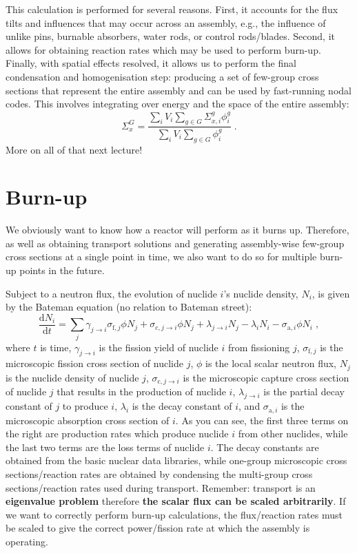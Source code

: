 \documentclass{article}
\begin{document}
This calculation is performed for several reasons. First, it accounts for the flux tilts and influences that may occur across an assembly, e.g., the influence of unlike pins, burnable absorbers, water rods, or control rods/blades. Second, it allows for obtaining reaction rates which may be used to perform burn-up. Finally, with spatial effects resolved, it allows us to perform the final condensation and homogenisation step: producing a set of few-group cross sections that represent the entire assembly and can be used by fast-running nodal codes. This involves integrating over energy and the space of the entire assembly:
\begin{equation}
    \Sigma^G_x = \frac{\sum_i V_i \sum_{g\in G}\Sigma^g_{x,i}\phi^g_i}{\sum_i V_i \sum_{g\in G}\phi^g_i}\;\mathrm{.}
\end{equation}
More on all of that next lecture!

\section{Burn-up}

We obviously want to know how a reactor will perform as it burns up. Therefore, as well as obtaining transport solutions and generating assembly-wise few-group cross sections at a single point in time, we also want to do so for multiple burn-up points in the future.

Subject to a neutron flux, the evolution of nuclide $i$'s nuclide density, $N_i$, is given by the Bateman equation (no relation to Bateman street):
\begin{equation}\label{eq:bateman}
    \frac{\mathrm{d}N_i}{\mathrm{d}t} = \sum_j \gamma_{j\rightarrow i}\sigma_{\mathrm{f},j}\phi N_j + \sigma_{\mathrm{c},j\rightarrow i}\phi N_j +\lambda_{j\rightarrow i}N_j - \lambda_i N_i - \sigma_{\mathrm{a},i}\phi N_i\;\mathrm{,}
\end{equation}
where $t$ is time, $\gamma_{j\rightarrow i}$ is the fission yield of nuclide $i$ from fissioning $j$, $\sigma_{\mathrm{f},j}$ is the microscopic fission cross section of nuclide $j$, $\phi$ is the local scalar neutron flux, $N_j$ is the nuclide density of nuclide $j$, $\sigma_{\mathrm{c},j\rightarrow i}$ is the microscopic capture cross section of nuclide $j$ that results in the production of nuclide $i$, $\lambda_{j\rightarrow i}$ is the partial decay constant of $j$ to produce $i$, $\lambda_i$ is the decay constant of $i$, and $\sigma_{\mathrm{a},i}$ is the microscopic absorption cross section of $i$. As you can see, the first three terms on the right are production rates which produce nuclide $i$ from other nuclides, while the last two terms are the loss terms of nuclide $i$. The decay constants are obtained from the basic nuclear data libraries, while one-group microscopic cross sections/reaction rates are obtained by condensing the multi-group cross sections/reaction rates used during transport. Remember: transport is an \textbf{eigenvalue problem} therefore \textbf{the scalar flux can be scaled arbitrarily}. If we want to correctly perform burn-up calculations, the flux/reaction rates must be scaled to give the correct power/fission rate at which the assembly is operating.
\end{document}
